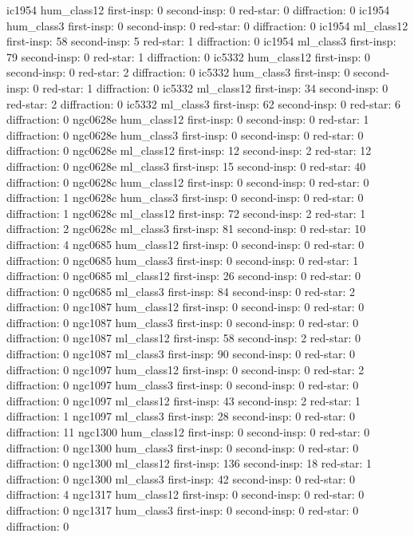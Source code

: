 ic1954 hum_class12 first-insp: 0 second-insp:  0 red-star:  0 diffraction:  0
ic1954 hum_class3 first-insp: 0 second-insp:  0 red-star:  0 diffraction:  0
ic1954 ml_class12 first-insp: 58 second-insp:  5 red-star:  1 diffraction:  0
ic1954 ml_class3 first-insp: 79 second-insp:  0 red-star:  1 diffraction:  0
ic5332 hum_class12 first-insp: 0 second-insp:  0 red-star:  2 diffraction:  0
ic5332 hum_class3 first-insp: 0 second-insp:  0 red-star:  1 diffraction:  0
ic5332 ml_class12 first-insp: 34 second-insp:  0 red-star:  2 diffraction:  0
ic5332 ml_class3 first-insp: 62 second-insp:  0 red-star:  6 diffraction:  0
ngc0628e hum_class12 first-insp: 0 second-insp:  0 red-star:  1 diffraction:  0
ngc0628e hum_class3 first-insp: 0 second-insp:  0 red-star:  0 diffraction:  0
ngc0628e ml_class12 first-insp: 12 second-insp:  2 red-star:  12 diffraction:  0
ngc0628e ml_class3 first-insp: 15 second-insp:  0 red-star:  40 diffraction:  0
ngc0628c hum_class12 first-insp: 0 second-insp:  0 red-star:  0 diffraction:  1
ngc0628c hum_class3 first-insp: 0 second-insp:  0 red-star:  0 diffraction:  1
ngc0628c ml_class12 first-insp: 72 second-insp:  2 red-star:  1 diffraction:  2
ngc0628c ml_class3 first-insp: 81 second-insp:  0 red-star:  10 diffraction:  4
ngc0685 hum_class12 first-insp: 0 second-insp:  0 red-star:  0 diffraction:  0
ngc0685 hum_class3 first-insp: 0 second-insp:  0 red-star:  1 diffraction:  0
ngc0685 ml_class12 first-insp: 26 second-insp:  0 red-star:  0 diffraction:  0
ngc0685 ml_class3 first-insp: 84 second-insp:  0 red-star:  2 diffraction:  0
ngc1087 hum_class12 first-insp: 0 second-insp:  0 red-star:  0 diffraction:  0
ngc1087 hum_class3 first-insp: 0 second-insp:  0 red-star:  0 diffraction:  0
ngc1087 ml_class12 first-insp: 58 second-insp:  2 red-star:  0 diffraction:  0
ngc1087 ml_class3 first-insp: 90 second-insp:  0 red-star:  0 diffraction:  0
ngc1097 hum_class12 first-insp: 0 second-insp:  0 red-star:  2 diffraction:  0
ngc1097 hum_class3 first-insp: 0 second-insp:  0 red-star:  0 diffraction:  0
ngc1097 ml_class12 first-insp: 43 second-insp:  2 red-star:  1 diffraction:  1
ngc1097 ml_class3 first-insp: 28 second-insp:  0 red-star:  0 diffraction:  11
ngc1300 hum_class12 first-insp: 0 second-insp:  0 red-star:  0 diffraction:  0
ngc1300 hum_class3 first-insp: 0 second-insp:  0 red-star:  0 diffraction:  0
ngc1300 ml_class12 first-insp: 136 second-insp:  18 red-star:  1 diffraction:  0
ngc1300 ml_class3 first-insp: 42 second-insp:  0 red-star:  0 diffraction:  4
ngc1317 hum_class12 first-insp: 0 second-insp:  0 red-star:  0 diffraction:  0
ngc1317 hum_class3 first-insp: 0 second-insp:  0 red-star:  0 diffraction:  0
